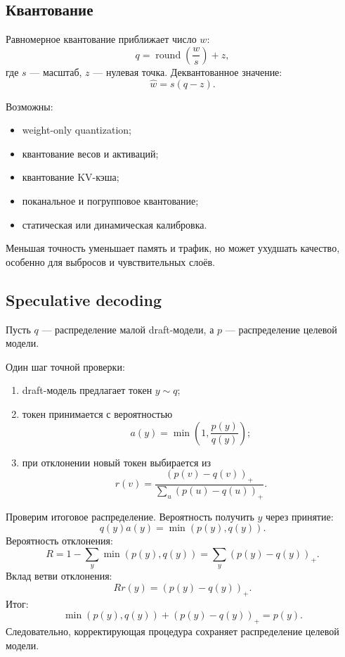 \documentclass[12pt,a4paper]{article}
\newcommand{\1}{\mathbf{1}}
\theoremstyle{definition}
\theoremstyle{remark}
\begin{document}
\subsection{Квантование}

Равномерное квантование приближает число $w$:
\[
q=\operatorname{round}\left(\frac{w}{s}\right)+z,
\]
где $s$ --- масштаб, $z$ --- нулевая точка. Деквантованное значение:
\[
\widehat{w}=s(q-z).
\]

Возможны:

\begin{itemize}
    \item weight-only quantization;
    \item квантование весов и активаций;
    \item квантование KV-кэша;
    \item поканальное и погрупповое квантование;
    \item статическая или динамическая калибровка.
\end{itemize}

Меньшая точность уменьшает память и трафик, но может ухудшать качество,
особенно для выбросов и чувствительных слоёв.

\subsection{Speculative decoding}

Пусть $q$ --- распределение малой draft-модели, а $p$ ---
распределение целевой модели.

Один шаг точной проверки:

\begin{enumerate}
    \item draft-модель предлагает токен $y\sim q$;
    \item токен принимается с вероятностью
    \[
    a(y)=\min\left(1,\frac{p(y)}{q(y)}\right);
    \]
    \item при отклонении новый токен выбирается из
    \[
    r(v)
    =
    \frac{(p(v)-q(v))_+}
    {\sum_u(p(u)-q(u))_+}.
    \]
\end{enumerate}

Проверим итоговое распределение. Вероятность получить $y$ через принятие:
\[
q(y)a(y)=\min(p(y),q(y)).
\]
Вероятность отклонения:
\[
R
=
1-\sum_y\min(p(y),q(y))
=
\sum_y(p(y)-q(y))_+.
\]
Вклад ветви отклонения:
\[
Rr(y)=(p(y)-q(y))_+.
\]
Итог:
\[
\min(p(y),q(y))+(p(y)-q(y))_+=p(y).
\]
Следовательно, корректирующая процедура сохраняет распределение целевой
модели.
\end{document}
